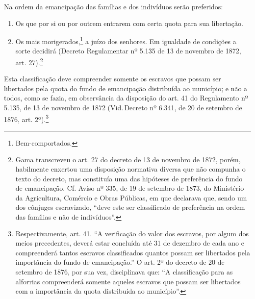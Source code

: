 Na ordem da emancipação das famílias e dos indivíduos serão preferidos:

\begin{enumerate}[label=\arabic*º]
\item Os que por si ou por outrem entrarem com certa quota para sua
libertação.

\item Os mais morigerados,\footnote{Bem-comportados.} a juízo dos
senhores. Em igualdade de condições a sorte decidirá (Decreto
Regulamentar nº 5.135 de 13 de novembro de 1872, art. 27).\footnote{
  Gama transcreveu o art. 27 do decreto de 13 de novembro de 1872, porém, habilmente
  enxertou uma disposição normativa diversa que não compunha o texto do
  decreto, mas constituía uma das hipóteses de preferência do
  fundo de emancipação. Cf. Aviso nº 335, de 19 de setembro de 1873, do Ministério
  da Agricultura, Comércio e Obras Públicas, em que declarava que, sendo
  um dos cônjuges escravizado, ``deve este ser classificado de
  preferência na ordem das famílias e não de indivíduos''.}
\end{enumerate}  

Esta classificação deve compreender somente os escravos que possam ser
libertados pela quota do fundo de emancipação distribuída ao município;
e não a todos, como se fazia, em observância da disposição do art. 41 do
Regulamento nº 5.135, de 13 de novembro de 1872
(Vid.\,Decreto nº 6.341,
de 20 de setembro de 1876, art. 2º).\footnote{Respectivamente, art.
  41. ``A verificação do valor dos escravos, por algum dos meios
  precedentes, deverá estar concluída até 31 de dezembro de cada ano e
  compreenderá tantos escravos classificados quantos possam ser
  libertados pela importância do fundo de emancipação.'' O art. 2º do
  decreto de 20 de setembro de 1876, por sua vez, disciplinava que: ``A classificação
  para as alforrias compreenderá somente aqueles escravos que possam ser
  libertados com a importância da quota distribuída ao município''.}

